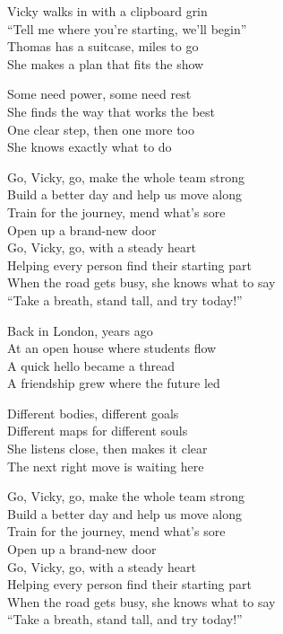 \begin{lyrics}
Vicky walks in with a clipboard grin\\
“Tell me where you’re starting, we’ll begin”\\
Thomas has a suitcase, miles to go\\
She makes a plan that fits the show

Some need power, some need rest\\
She finds the way that works the best\\
One clear step, then one more too\\
She knows exactly what to do

Go, Vicky, go, make the whole team strong\\
Build a better day and help us move along\\
Train for the journey, mend what’s sore\\
Open up a brand-new door\\
Go, Vicky, go, with a steady heart\\
Helping every person find their starting part\\
When the road gets busy, she knows what to say\\
“Take a breath, stand tall, and try today!”

Back in London, years ago\\
At an open house where students flow\\
A quick hello became a thread\\
A friendship grew where the future led

Different bodies, different goals\\
Different maps for different souls\\
She listens close, then makes it clear\\
The next right move is waiting here

Go, Vicky, go, make the whole team strong\\
Build a better day and help us move along\\
Train for the journey, mend what’s sore\\
Open up a brand-new door\\
Go, Vicky, go, with a steady heart\\
Helping every person find their starting part\\
When the road gets busy, she knows what to say\\
“Take a breath, stand tall, and try today!”


\end{lyrics}
